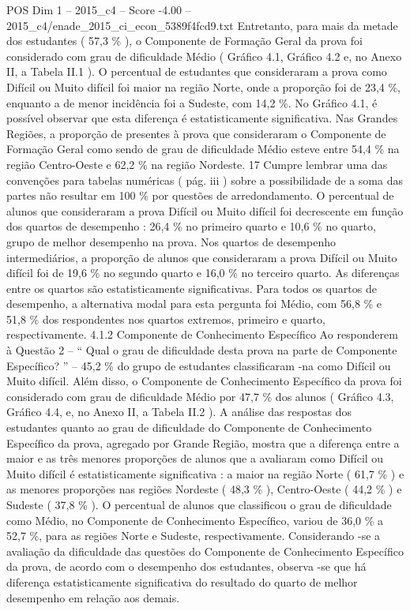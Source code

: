 \begin{textsample}{POS Dim 1 – 2015\_c4 – Score -4.00 – 2015\_c4/enade\_2015\_ci\_econ\_5389f4fcd9.txt}
Entretanto, para mais da metade dos estudantes ( 57,3 \% ), o Componente de Formação Geral da prova foi considerado com grau de dificuldade Médio ( Gráfico 4.1, Gráfico 4.2 e, no Anexo II, a Tabela II.1 ).
O percentual de estudantes que consideraram a prova como Difícil ou Muito difícil foi maior na região Norte, onde a proporção foi de 23,4 \%, enquanto a de menor incidência foi a Sudeste, com 14,2 \%.
No Gráfico 4.1, é possível observar que esta diferença é estatisticamente significativa.
Nas Grandes Regiões, a proporção de presentes à prova que consideraram o Componente de Formação Geral como sendo de grau de dificuldade Médio esteve entre 54,4 \% na região Centro-Oeste e 62,2 \% na região Nordeste. 17 Cumpre lembrar uma das convenções para tabelas numéricas ( pág. iii ) sobre a possibilidade de a soma das partes não resultar em 100 \% por questões de arredondamento.
O percentual de alunos que consideraram a prova Difícil ou Muito difícil foi decrescente em função dos quartos de desempenho : 26,4 \% no primeiro quarto e 10,6 \% no quarto, grupo de melhor desempenho na prova.
Nos quartos de desempenho intermediários, a proporção de alunos que consideraram a prova Difícil ou Muito difícil foi de 19,6 \% no segundo quarto e 16,0 \% no terceiro quarto.
As diferenças entre os quartos são estatisticamente significativas.
Para todos os quartos de desempenho, a alternativa modal para esta pergunta foi Médio, com 56,8 \% e 51,8 \% dos respondentes nos quartos extremos, primeiro e quarto, respectivamente. 4.1.2 Componente de Conhecimento Específico Ao responderem à Questão 2 – “ Qual o grau de dificuldade desta prova na parte de Componente Específico? ” – 45,2 \% do grupo de estudantes classificaram -na como Difícil ou Muito difícil.
Além disso, o Componente de Conhecimento Específico da prova foi considerado com grau de dificuldade Médio por 47,7 \% dos alunos ( Gráfico 4.3, Gráfico 4.4, e, no Anexo II, a Tabela II.2 ).
A análise das respostas dos estudantes quanto ao grau de dificuldade do Componente de Conhecimento Específico da prova, agregado por Grande Região, mostra que a diferença entre a maior e as três menores proporções de alunos que a avaliaram como Difícil ou Muito difícil é estatisticamente significativa : a maior na região Norte ( 61,7 \% ) e as menores proporções nas regiões Nordeste ( 48,3 \% ), Centro-Oeste ( 44,2 \% ) e Sudeste ( 37,8 \% ).
O percentual de alunos que classificou o grau de dificuldade como Médio, no Componente de Conhecimento Específico, variou de 36,0 \% a 52,7 \%, para as regiões Norte e Sudeste, respectivamente.
Considerando -se a avaliação da dificuldade das questões do Componente de Conhecimento Específico da prova, de acordo com o desempenho dos estudantes, observa -se que há diferença estatisticamente significativa do resultado do quarto de melhor desempenho em relação aos demais.

\end{textsample}
